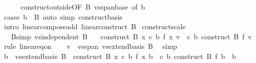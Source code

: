 \begin{isabellebody}
\ \ \ \ \isamarkupfalse%
\ construct{\isacharunderscore}{\kern0pt}outside{\isacharbrackleft}{\kern0pt}OF\ B\ vs{}{\isachardot}{\kern0pt}span{\isacharunderscore}{\kern0pt}base{\isacharcomma}{\kern0pt}\ of\ b{\isacharbrackright}{\kern0pt}\ \isamarkupfalse%
\ {\isacharparenleft}{\kern0pt}cases\ {\isachardoublequoteopen}b\ {\isasymin}\ B{\isachardoublequoteclose}{\isacharparenright}{\kern0pt}\ {\isacharparenleft}{\kern0pt}auto\ simp{\isacharcolon}{\kern0pt}\ construct{\isacharunderscore}{\kern0pt}basis{\isacharparenright}{\kern0pt}\isanewline
{}\isamarkupfalse%
\ {\isacharparenleft}{\kern0pt}intro\ linear{\isacharunderscore}{\kern0pt}compose{\isacharunderscore}{\kern0pt}add\ linear{\isacharunderscore}{\kern0pt}construct\ B{\isacharparenright}{\kern0pt}{\isacharplus}{\kern0pt}%
\endisatagproof
{\isafoldproof}%
%
\isadelimproof
\isanewline
%
\endisadelimproof
\isanewline
{}\isamarkupfalse%
\ construct{\isacharunderscore}{\kern0pt}scale{\isacharcolon}{\kern0pt}\isanewline
\ \ \ B{\isacharbrackleft}{\kern0pt}simp{\isacharbrackright}{\kern0pt}{\isacharcolon}{\kern0pt}\ {\isachardoublequoteopen}vs{}{\isachardot}{\kern0pt}independent\ B{\isachardoublequoteclose}\isanewline
\ \ \ {\isachardoublequoteopen}construct\ B\ {\isacharparenleft}{\kern0pt}{\isasymlambda}x{\isachardot}{\kern0pt}\ c\ {\isacharasterisk}{\kern0pt}b\ f\ x{\isacharparenright}{\kern0pt}\ v\ {\isacharequal}{\kern0pt}\ c\ {\isacharasterisk}{\kern0pt}b\ construct\ B\ f\ v{\isachardoublequoteclose}\isanewline
%
\isadelimproof
%
\endisadelimproof
%
\isatagproof
{}\isamarkupfalse%
\ {\isacharparenleft}{\kern0pt}rule\ linear{\isacharunderscore}{\kern0pt}eq{\isacharunderscore}{\kern0pt}on{\isacharparenright}{\kern0pt}\isanewline
\ \ \isamarkupfalse%
\ {\isachardoublequoteopen}v\ {\isasymin}\ vs{}{\isachardot}{\kern0pt}span\ {\isacharparenleft}{\kern0pt}vs{}{\isachardot}{\kern0pt}extend{\isacharunderscore}{\kern0pt}basis\ B{\isacharparenright}{\kern0pt}{\isachardoublequoteclose}\ \isamarkupfalse%
\ simp\isanewline
\ \ \isamarkupfalse%
\ {\isachardoublequoteopen}b\ {\isasymin}\ vs{}{\isachardot}{\kern0pt}extend{\isacharunderscore}{\kern0pt}basis\ B\ {\isasymLongrightarrow}\ construct\ B\ {\isacharparenleft}{\kern0pt}{\isasymlambda}x{\isachardot}{\kern0pt}\ c\ {\isacharasterisk}{\kern0pt}b\ f\ x{\isacharparenright}{\kern0pt}\ b\ {\isacharequal}{\kern0pt}\ c\ {\isacharasterisk}{\kern0pt}b\ construct\ B\ f\ b{\isachardoublequoteclose}\ \ b\isanewline

\end{isabellebody}
